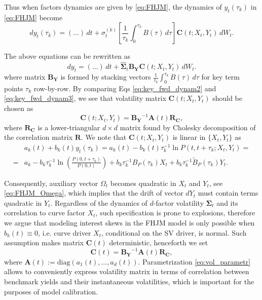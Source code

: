 \documentclass[pdftex,11pt,a4paper] {article}
\begin{document}
Thus when factors dynamics are given by \eqref{eq:FHJM}, the dynamics of $y_t(\tau_k)$ in \eqref{eq:FHJM} become
\begin{equation*}
dy_t(\tau_k)=(\ldots)\,dt + \sigma_t^{(k)}\left[\frac{1}{\tau_k}\int_0^{\tau_k}B(\tau)\,d\tau\right]\mathbf{C}(t;X_t,Y_t)\,dW_t.
\end{equation*}


The above equations can be rewritten as
\begin{equation}\label{eq:key_fwd_dynam3}
dy_t=(\ldots)\,dt + \hat{\mathbf{\Sigma}}_t\mathbf{B_Y}\mathbf{C}(t;X_t,Y_t)\,dW_t.
\end{equation}
where matrix $\mathbf{B_Y}$ is formed by stacking vectors $\frac{1}{\tau_k}\int_0^{\tau_k}B(\tau)\,d\tau$ for key term points $\tau_k$ row-by-row. By comparing Eqs \eqref{eq:key_fwd_dynam2} and \eqref{eq:key_fwd_dynam3}, we see that volatility matrix $\mathbf{C}(t;X_t,Y_t)$ should be chosen as 
\begin{equation}\label{eq:vol_parametr0}
\mathbf{C}(t;X_t,Y_t)=\mathbf{B_Y}^{-1}\mathbf{A}(t)\mathbf{R_C},
\end{equation}
where $\mathbf{R_C}$ is a lower-triangular $d\times d$ matrix found by Cholesky decomposition of the correlation matrix $\mathbf{R}$. We note that $\mathbf{C}(t;X_t,Y_t)$ is linear in $\{X_t,Y_t\}$ as 
\begin{equation*}
\begin{split}
&a_k(t)+b_k(t)y_t(\tau_k)=a_k(t)-b_k(t)\tau_k^{-1}\ln P\left(t,t+\tau_k;X_t,Y_t\right)=\\
=&a_k-b_k\tau_k^{-1}\ln\left(\frac{P(0,t+\tau_k)}{P(0,t)}\right)+b_k\tau_k^{-1}B_P(\tau_k)X_t+b_k\tau_k^{-1}\tilde{B}_P(\tau_k)Y_t.
\end{split}
\end{equation*}

Consequently, auxiliary vector $\Omega_t$ becomes quadratic in $X_t$ and $Y_t$, see \eqref{eq:FHJM_Omega}, which implies that the drift of vector $dY_t$ must contain terms quadratic in $Y_t$. Regardless of the dynamics of $d$-factor volatility $\mathbf{\Sigma}_t$ and its correlation to curve factor $X_t$, such specification is prone to explosions, therefore we argue that modeling interest skews in the FHJM model is only possible when $b_k(t)\equiv 0$, i.e. curve driver $X_{t}$, conditional on the SV driver, is normal. Such assumption makes matrix $\mathbf{C}(t)$ deterministic, henceforth we set
\begin{equation}\label{eq:vol_parametr}
\mathbf{C}(t)=\mathbf{B_Y}^{-1}\mathbf{A}(t)\mathbf{R_C},
\end{equation}
where $\mathbf{A}(t):=\mathrm{diag}\left(a_1(t),\ldots,a_d(t)\right)$. Parametrization \eqref{eq:vol_parametr} allows to conveniently express volatility matrix in terms of correlation between benchmark yields and their instantaneous volatilities, which is important for the purposes of model calibration.  
\end{document}
